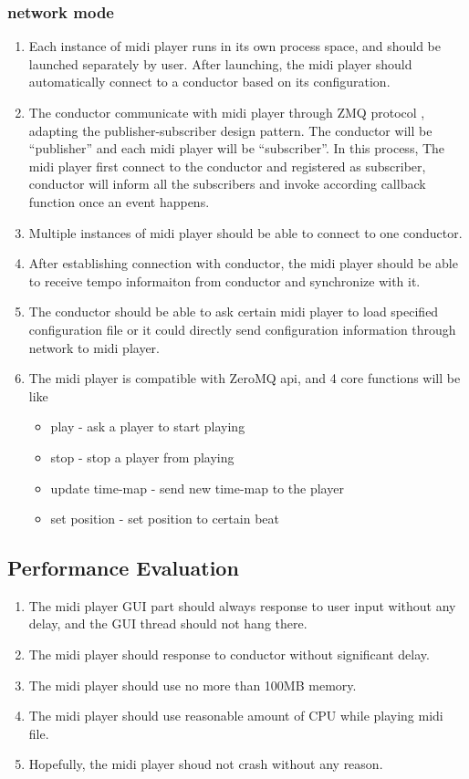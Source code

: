 \documentclass[12pt]{article} %
\begin{document}
\subsubsection{network mode}
\begin{enumerate}
  \item Each instance of midi player runs in its own process space, and should be launched separately by user.
        After launching, the midi player should automatically connect to a conductor 
        based on its configuration.
  \item The conductor communicate with midi player through ZMQ protocol \cite{ZMQ}, adapting the publisher-subscriber 
        design pattern. The conductor will be ``publisher'' and each midi player will be ``subscriber''. In this process, 
        The midi player first connect to the conductor and registered as subscriber, conductor will inform all the 
        subscribers and invoke according callback function once an event happens.
  \item Multiple instances of midi player should be able to connect to one conductor. 
  \item After establishing connection with conductor, the midi player should be able to receive tempo informaiton 
        from conductor and synchronize with it.     
  \item The conductor should be able to ask certain midi player to load specified configuration file or it could directly 
        send configuration information through network to midi player.
  \item 
    The midi player is compatible with ZeroMQ \cite{zeromq} api, and 4 core functions will be like
    \begin{itemize}
      \item play - ask a player to start playing 
      \item stop - stop a player from playing 
      \item update time-map - send new time-map to the player 
      \item set position - set position to certain beat 
    \end{itemize}
\end{enumerate}

\subsection{Performance Evaluation}
\begin{enumerate}
  \item The midi player GUI part should always response to user input without any delay, and the GUI thread 
        should not hang there.
  \item The midi player should response to conductor without significant delay.
  \item The midi player should use no more than 100MB memory.
  \item The midi player should use reasonable amount of CPU while playing midi file.
  \item Hopefully, the midi player shoud not crash without any reason. 
\end{enumerate}
\end{document}
